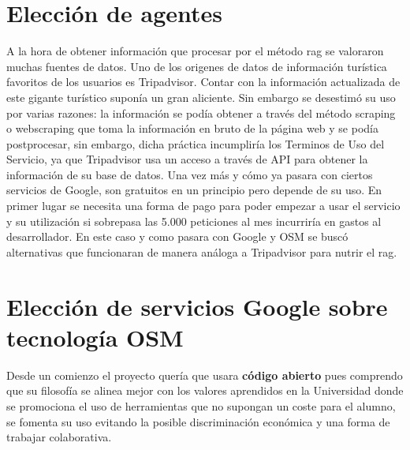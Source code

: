 \section{Elección de agentes}
A la hora de obtener información que procesar por el método \acrshort{rag} se valoraron muchas fuentes de datos. Uno de los origenes de datos de información turística favoritos de los usuarios es Tripadvisor. Contar con la información actualizada de este gigante turístico suponía un gran aliciente. Sin embargo se desestimó su uso por varias razones: la información se podía obtener a través del método scraping o webscraping que toma la información en bruto de la página web y se podía postprocesar, sin embargo, dicha práctica incumpliría los Terminos de Uso del Servicio, ya que Tripadvisor usa un acceso a través de API para obtener la información de su base de datos. Una vez más y cómo ya pasara con ciertos servicios de Google, son gratuitos en un principio pero depende de su uso. En primer lugar se necesita una forma de pago para poder empezar a usar el servicio y su utilización si sobrepasa las 5.000 peticiones al mes incurriría en gastos al desarrollador. En este caso y como pasara con Google y OSM se buscó alternativas que funcionaran de manera análoga a Tripadvisor para nutrir el \acrshort{rag}.

\section{Elección de servicios Google sobre tecnología OSM}
\label{sec:google_over_osm}
Desde un comienzo el proyecto quería que usara\textbf{ código abierto} pues comprendo que su filosofía se alinea mejor con los valores aprendidos en la Universidad donde se promociona el uso de herramientas que no supongan un coste para el alumno, se fomenta su uso evitando la posible discriminación económica y una forma de trabajar colaborativa.

